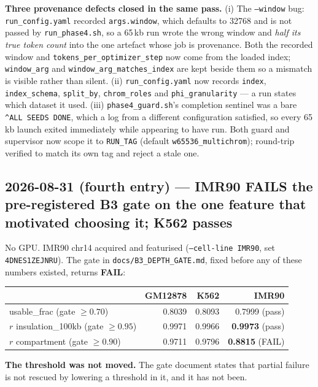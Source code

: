 \documentclass[11pt,a4paper]{article}
\newcommand{\code}[1]{\texttt{\small #1}}
\begin{document}
\textbf{Three provenance defects closed in the same pass.} (i) The
\code{--window} bug: \code{run\_config.yaml} recorded \code{args.window},
which defaults to 32768 and is not passed by \code{run\_phase4.sh}, so a 65\,kb
run wrote the wrong window and \emph{half its true token count} into the one
artefact whose job is provenance. Both the recorded window and
\code{tokens\_per\_optimizer\_step} now come from the loaded index;
\code{window\_arg} and \code{window\_arg\_matches\_index} are kept beside them
so a mismatch is visible rather than silent. (ii) \code{run\_config.yaml} now
records \code{index}, \code{index\_schema}, \code{split\_by},
\code{chrom\_roles} and \code{phi\_granularity} --- a run states which dataset
it used. (iii) \code{phase4\_guard.sh}'s completion sentinel was a bare
\code{\textasciicircum ALL SEEDS DONE}, which a log from a different
configuration satisfied, so every 65\,kb launch exited immediately while
appearing to have run. Both guard and supervisor now scope it to
\code{RUN\_TAG} (default \code{w65536\_multichrom}); round-trip verified to
match its own tag and reject a stale one.

\subsection*{2026-08-31 (fourth entry) --- IMR90 FAILS the pre-registered B3
gate on the one feature that motivated choosing it; K562 passes}

No GPU. IMR90 chr14 acquired and featurised (\code{--cell-line IMR90}, set
\code{4DNES1ZEJNRU}). The gate in \code{docs/B3\_DEPTH\_GATE.md}, fixed before
any of these numbers existed, returns \textbf{FAIL}:

\begin{center}
\begin{tabular}{lrrr}
\hline
 & GM12878 & K562 & IMR90 \\
\hline
usable\_frac (gate $\geq 0.70$)      & 0.8039 & 0.8093 & 0.7999 (pass) \\
$r$ insulation\_100kb (gate $\geq 0.95$) & 0.9971 & 0.9966 & \textbf{0.9973} (pass) \\
$r$ compartment (gate $\geq 0.90$)  & 0.9711 & 0.9796 & \textbf{0.8815} (FAIL) \\
\hline
\end{tabular}
\end{center}

\textbf{The threshold was not moved.} The gate document states that partial
failure is not rescued by lowering a threshold in it, and it has not been.
\end{document}

